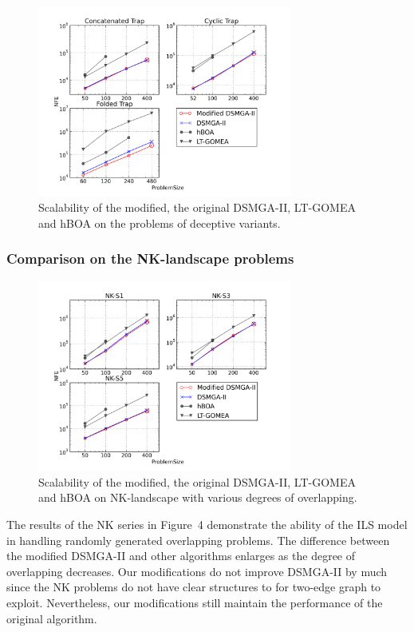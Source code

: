 \begin{figure}
\centering
\includegraphics[width=3.3in]{trapResults}
\caption{Scalability of the modified, the original DSMGA-II, LT-GOMEA and hBOA on the problems of deceptive variants.}
\label{fig:trap}
\end{figure}


\subsubsection{Comparison on the NK-landscape problems}

\begin{figure}
\centering
\includegraphics[width=3.3in]{nkResults}
\caption{Scalability of the modified, the original DSMGA-II, LT-GOMEA and hBOA on NK-landscape with various degrees of overlapping.}
\end{figure}


The results of the NK series in Figure~4 demonstrate the ability of the ILS model in handling randomly generated overlapping problems. 
The difference between the modified DSMGA-II and other algorithms enlarges as the degree of overlapping decreases. 
Our modifications do not improve DSMGA-II by much since the NK problems do not have clear structures to for two-edge graph to exploit. Nevertheless, our modifications still maintain the performance of the original algorithm. 

